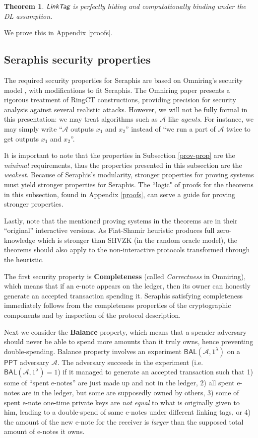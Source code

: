 \documentclass{article}
\theoremstyle{plain}
\newtheorem{theorem}{Theorem}[section]
\theoremstyle{remark}
\begin{document}
\begin{theorem}\label{thm-linktag}
$\emph{\textsf{LinkTag}}$ is perfectly hiding and computationally binding under the DL assumption.
\end{theorem}
\noindent We prove this in Appendix \ref{proofs}.

\subsection{Seraphis security properties}\label{sec-thm}
The required security properties for Seraphis are based on Omniring's security model \cite{omniring}, with modifications to fit Seraphis. The Omniring paper presents a rigorous treatment of RingCT constructions, providing precision for security analysis against several realistic attacks. However, we will not be fully formal in this presentation: we may treat algorithms such as $\mathcal{A}$ like \textit{agents}. For instance, we may simply write ``$\mathcal{A}$ outputs $x_1$ and $x_2$'' instead of ``we run a part of $\mathcal{A}$ twice to get outputs $x_1$ and $x_2$''.

It is important to note that the properties in Subsection \ref{prov-prop} are the \textit{minimal} requirements, thus the properties presented in this subsection are the \textit{weakest}. Because of Seraphis's modularity, stronger properties for proving systems must yield stronger properties for Seraphis. The ``logic" of proofs for the theorems in this subsection, found in Appendix \ref{proofs}, can serve a guide for proving stronger properties.

Lastly, note that the mentioned proving systems in the theorems are in their ``original'' interactive versions. As Fiat-Shamir heuristic produces full zero-knowledge which is stronger than SHVZK (in the random oracle model), the theorems should also apply to the non-interactive protocols transformed through the heuristic.

The first security property is \textbf{Completeness} (called \textit{Correctness} in Omniring), which means that if an e-note appears on the ledger, then its owner can honestly generate an accepted transaction spending it. Seraphis satisfying completeness immediately follows from the completeness properties of the cryptographic components and by inspection of the protocol description.

Next we consider the \textbf{Balance} property, which means that a spender adversary should never be able to spend more amounts than it truly owns, hence preventing double-spending. Balance property involves an experiment $\textsf{BAL}(\mathcal{A}, 1^{\lambda})$  on a $\textsf{PPT}$ adversary $\mathcal{A}$. The adversary succeeds in the experiment (i.e. $\textsf{BAL}(\mathcal{A}, 1^{\lambda})=1$) if it managed to generate an accepted transaction such that
1) some of ``spent e-notes'' are just made up and not in the ledger, 2) all spent e-notes are in the ledger, but some are supposedly owned by others, 3) some of spent e-note one-time private keys are \textit{not equal} to what is originally given to him, leading to a double-spend of same e-notes under different linking tags, or 4) the amount of the new e-note for the receiver is \textit{larger} than the supposed total amount of e-notes it owns.
\end{document}

